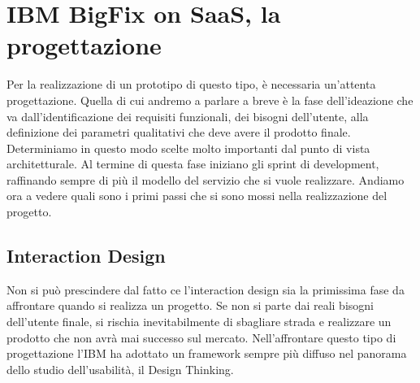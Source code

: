 \chapter{IBM BigFix on SaaS, la progettazione}
Per la realizzazione di un prototipo di questo tipo, è necessaria un'attenta progettazione. Quella di cui andremo a parlare a breve è la fase dell'ideazione che va dall'identificazione dei requisiti funzionali, dei bisogni dell'utente, alla definizione dei parametri qualitativi che deve avere il prodotto finale. Determiniamo in questo modo scelte molto importanti dal punto di vista architetturale. Al termine di questa fase iniziano gli sprint di development, raffinando sempre di più il modello del servizio che si vuole realizzare. Andiamo ora a vedere quali sono i primi passi che si sono mossi nella realizzazione del progetto.

\section{Interaction Design}
Non si può prescindere dal fatto ce l'interaction design sia la primissima fase da affrontare quando si realizza un progetto. Se non si parte dai reali bisogni dell'utente finale, si rischia inevitabilmente di sbagliare strada e realizzare un prodotto che non avrà mai successo sul mercato. Nell'affrontare questo tipo di progettazione l'IBM ha adottato un framework sempre più diffuso nel panorama dello studio dell'usabilità, il Design Thinking.

